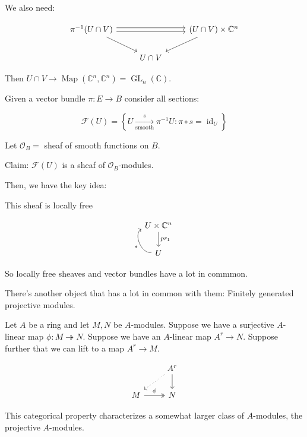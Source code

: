 \documentclass{article}
\theoremstyle{definition}
\begin{document}
    We also need:

    \[
        \begin{tikzcd}
            \pi ^{-1} (U \cap V) \ar[rr, shift right] \ar[rr, shift left] \ar[rd] & & (U \cap V) \times \mathbb{C}^n \ar[ld] \\ & U \cap V
        \end{tikzcd}
    \]

    Then \(U \cap V \to \operatorname{Map} (\mathbb{C}^n , \mathbb{C}^n) = \operatorname{GL}_n(\mathbb{C})\).

    Given a vector bundle \(\pi: E \to B\) consider all sections:

    \[
        \mathcal{F} (U) = \left\{ U \xrightarrow[\text{smooth}]{s} \pi ^{-1} U : \pi \circ s = \operatorname{id}_{U} \right\} 
    \]

    Let \(\mathcal{O}_B =\) sheaf of smooth functions on \(B\).

    Claim: \(\mathcal{F}(U)\) is a sheaf of \(\mathcal{O}_B\)-modules.

    Then, we have the key idea:

    \begin{center}
        This sheaf is locally free
    \end{center}

    \[
        \begin{tikzcd}
            U \times \mathbb{C}^n \ar[d,"pr_1"] \\ U \ar[u, bend left = 80, "s"]
        \end{tikzcd}
    \]

    So locally free sheaves and vector bundles have a lot in commmon.

    There's another object that has a lot in common with them: Finitely generated projective modules.

    Let \(A\) be a ring and let \(M, N\) be \(A\)-modules. Suppose we have a surjective \(A\)-linear map \(\phi: M \twoheadrightarrow N\). Suppose we have an \(A\)-linear map \(A^r \to N\). Suppose further that we can lift to a map \(A^r \to M\).
    
    \[
        \begin{tikzcd}
            & A^r \ar[ld, dotted] \ar[d] \\ M \ar[r,"\phi", two heads] & N
        \end{tikzcd}
    \]

    This categorical property characterizes a somewhat larger class of \(A\)-modules, the projective \(A\)-modules.
\end{document}
